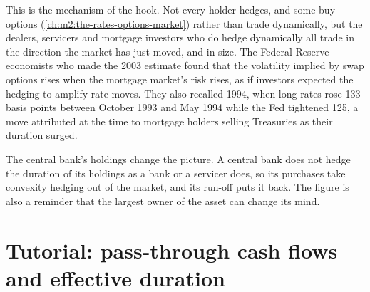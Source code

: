 This is the mechanism of the hook. Not every holder hedges, and some buy
options (\cref{ch:m2:the-rates-options-market}) rather than trade dynamically,
but the dealers, servicers and mortgage investors who do hedge dynamically all
trade in the direction the market has just moved, and in size. The Federal
Reserve economists who made the 2003 estimate found that the volatility implied
by swap options rises when the mortgage market's  risk rises, as if
investors expected the hedging to amplify rate moves. They also recalled 1994,
when long rates rose 133 basis points between October 1993 and May 1994 while
the Fed tightened 125, a move attributed at the time to mortgage holders
selling Treasuries as their duration surged.

\begin{omfigure}

\label{fig:m2:mortgages-and-agencies:fed}
\end{omfigure}

The central bank's holdings change the picture. A central bank does not
hedge the duration of its holdings as a bank or a servicer does, so its
purchases take convexity hedging out of the market, and its run-off puts it
back. The figure is also a reminder that the largest owner of
the asset can change its mind.

\section{Tutorial: pass-through cash flows and effective duration}\label{tut:m2:mortgages-and-agencies:prepay}

